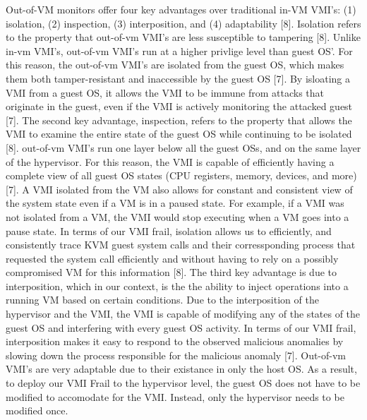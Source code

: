\documentclass{report}
\begin{document}
\begin{spacing}{1.5}
{\large
Out-of-VM monitors offer four key advantages over traditional in-VM VMI's: (1) isolation, (2) inspection, (3) interposition, and (4) adaptability [8]. Isolation refers to the property that out-of-vm VMI's are less susceptible to tampering [8]. Unlike in-vm VMI's, out-of-vm VMI's run at a higher privlige level than guest OS'. For this reason, the out-of-vm VMI's are isolated from the guest OS, which makes them both tamper-resistant and inaccessible by the guest OS [7]. By isloating a VMI from a guest OS, it allows the VMI to be immune from attacks that originate in the guest, even if the VMI is actively monitoring the attacked guest [7]. The second key advantage, inspection, refers to the property that allows the VMI to examine the entire state of the guest OS while continuing to be isolated [8]. out-of-vm VMI's run one layer below all the guest OSs, and on the same layer of the hypervisor. For this reason, the VMI is capable of efficiently having a complete view of all guest OS states (CPU registers, memory, devices, and more) [7]. A VMI isolated from the VM also allows for constant and consistent view of the system state even if a VM is in a paused state. For example, if a VMI was not isolated from a VM, the VMI would stop executing when a VM goes into a pause state. In terms of our VMI frail, isolation allows us to efficiently, and consistently trace KVM guest system calls and their corressponding process that requested the system call efficiently and without having to rely on a possibly compromised VM for this information [8]. The third key advantage is due to interposition, which in our context, is the the ability to inject operations into a running VM based on certain conditions. Due to the interposition of the hypervisor and the VMI, the VMI is capable of modifying any of the states of the guest OS and interfering with every guest OS activity. In terms of our VMI frail, interposition makes it easy to respond to the observed malicious anomalies by slowing down the process responsible for the malicious anomaly [7]. Out-of-vm VMI's are very adaptable due to their existance in only the host OS. As a result, to deploy our VMI Frail to the hypervisor level, the guest OS does not have to be modified to accomodate for the VMI. Instead, only the hypervisor needs to be modified once.
\newline
}


\end{spacing}
\end{document}
